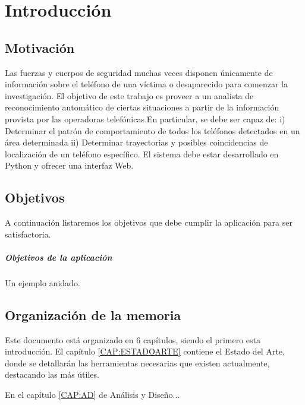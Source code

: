 \chapter{Introducción\label{CAP:INTRODUCCION}}
  \section{Motivación\label{SEC:MOTIVACION}}
    Las fuerzas y cuerpos de seguridad muchas veces disponen únicamente de información sobre el teléfono de una víctima o desaparecido para comenzar la investigación. El objetivo de este trabajo es proveer a un analista de reconocimiento automático de ciertas situaciones a partir de la información provista por las operadoras telefónicas.En particular, se debe ser capaz de:
    i) Determinar el patrón de comportamiento de todos los teléfonos detectados en un área determinada
    ii) Determinar trayectorias y posibles coincidencias de localización de un teléfono específico. 
    El sistema debe estar desarrollado en Python y ofrecer una interfaz Web.
  \section{Objetivos\label{SEC:OBJETIVOS}}
    A continuación listaremos los objetivos que debe cumplir la aplicación para ser satisfactoria.
    \paragraph{Objetivos de la aplicación}
    \begin{objetive}
      \item Un ejemplo anidado.
    \end{objetive}
  
  \section{Organización de la memoria\label{SEC:ORGANIZACION}}
    Este documento está organizado en 6 capítulos, siendo el primero esta introducción. 
    El capítulo \ref{CAP:ESTADOARTE} contiene el Estado del Arte, donde se detallarán las herramientas necesarias que existen actualmente, destacando las más útiles.
    
    En el capítulo \ref{CAP:AD} de Análisis y Diseño...